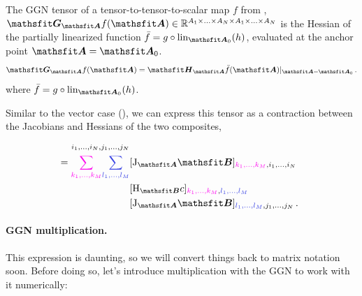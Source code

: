 \begin{definition}\label{def:general_ggn}%
  The GGN tensor of a tensor-to-tensor-to-scalar map $f$ from , $\tG_{\tA} f(\tA) \in \sR^{A_1 \times \ldots \times A_N \times A_1 \times \ldots \times A_N}$ is the Hessian of the partially linearized function $\bar{f} = g \circ \lin_{\tA_0}(h)$, evaluated at the anchor point $\tA = \tA_0$.
  \begin{align*}
    \tG_{\tA} f(\tA)
    =
    \tH_{\tA} \bar{f}(\tA)|_{\tA = \tA_0}\,.
  \end{align*}
  where $\bar{f} = g \circ \lin_{\tA_0}(h)$.

  Similar to the vector case (), we can express this tensor as a contraction between the Jacobians and Hessians of the two composites, \ie
  \begin{align*}
    [\tG_{\tA} f(\tA)]_{i_1, \ldots, i_N, j_1, \ldots, j_N}
    \\
    =
    \textcolor{VectorPink}{\sum_{k_1, \dots, k_M}}
    \textcolor{VectorBlue}{\sum_{l_1, \dots, l_M}}
    & [\jac_{\tA} \tB]_{\textcolor{VectorPink}{k_1, \dots, k_M}, i_1, \dots, i_N} \hspace{-1.3ex}
    \\
    & [\hess_{\tB} c]_{\textcolor{VectorPink}{k_{1}, \ldots, k_{M}}, \textcolor{VectorBlue}{l_{1}, \ldots, l_{M}}} \hspace{-1.3ex}
    \\
    & [\jac_{\tA} \tB]_{\textcolor{VectorBlue}{l_1, \ldots, l_M}, j_1, \ldots, j_N}\,. \hspace{-1.3ex}
  \end{align*}
\end{definition}

\paragraph{GGN multiplication.}
This expression is daunting, so we will convert things back to matrix notation soon.
Before doing so, let's introduce multiplication with the GGN to work with it numerically:

\switchcolumn[1]
\switchcolumn[0]

